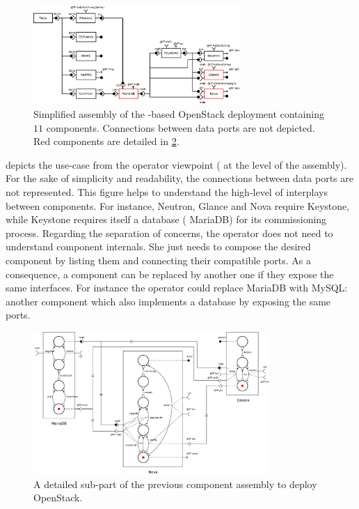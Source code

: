 \begin{figure}
  \begin{center}
    \includegraphics[width=0.7\textwidth]{./images/full.pdf}
    \caption{Simplified \mad assembly of the \kolla-based OpenStack deployment
    containing $11$ components. Connections between data ports are not depicted.
    Red components are detailed in \cref{fig:sub}.}
    \label{fig:full}
  \end{center}
\end{figure}

 depicts the use-case from the operator viewpoint (\ie
at the level of the \mad assembly). For the sake of simplicity and
readability, the connections between data ports are not
represented. This figure helps to understand the high-level of
interplays between components. For instance, Neutron, Glance and Nova
require Keystone, while Keystone requires itself a database (\ie
MariaDB) for its commissioning process. Regarding the separation of
concerns, the operator does not need to understand component
internals. She just needs to compose the desired component by listing
them and connecting their compatible ports. As a consequence, a
component can be replaced by another one if they expose the same
interfaces. For instance the operator could replace MariaDB with
MySQL: another component which also implements a database by exposing
the same ports.

\begin{figure}[t]
  \begin{center}
    \includegraphics[width=0.8\textwidth]{./images/sub.pdf}
    \caption{A detailed sub-part of the previous component assembly to deploy
    OpenStack.}
    \label{fig:sub}
  \end{center}
\end{figure}

